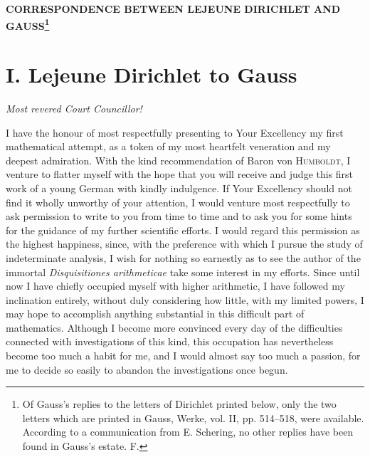 \documentclass[11pt]{article}
\newcommand{\scn}[1]{\textsc{#1}}
\begin{document}
\begin{center}
{\Large\bfseries CORRESPONDENCE BETWEEN LEJEUNE DIRICHLET AND GAUSS\footnote{Of Gauss's replies to the letters of Dirichlet printed below, only the two letters which are printed in Gauss, Werke, vol. II, pp. 514--518, were available. According to a communication from E. Schering, no other replies have been found in Gauss's estate. F.}\par}
\vspace{0.8em}
\end{center}

\section*{I. Lejeune Dirichlet to Gauss}
\begin{center}\emph{Most revered Court Councillor!}\end{center}

I have the honour of most respectfully presenting to Your Excellency my first mathematical attempt, as a token of my most heartfelt veneration and my deepest admiration. With the kind recommendation of Baron von \scn{Humboldt}, I venture to flatter myself with the hope that you will receive and judge this first work of a young German with kindly indulgence. If Your Excellency should not find it wholly unworthy of your attention, I would venture most respectfully to ask permission to write to you from time to time and to ask you for some hints for the guidance of my further scientific efforts. I would regard this permission as the highest happiness, since, with the preference with which I pursue the study of indeterminate analysis, I wish for nothing so earnestly as to see the author of the immortal \emph{Disquisitiones arithmeticae} take some interest in my efforts. Since until now I have chiefly occupied myself with higher arithmetic, I have followed my inclination entirely, without duly considering how little, with my limited powers, I may hope to accomplish anything substantial in this difficult part of mathematics. Although I become more convinced every day of the difficulties connected with investigations of this kind, this occupation has nevertheless become too much a habit for me, and I would almost say too much a passion, for me to decide so easily to abandon the investigations once begun.
\end{document}
